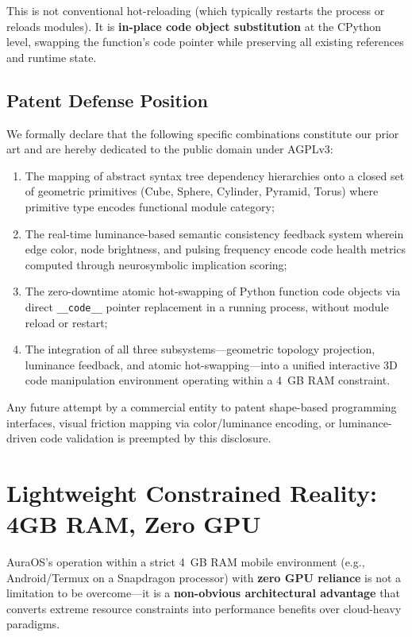 \documentclass[11pt]{article}
\begin{document}
This is not conventional hot-reloading (which typically restarts the process or reloads modules). It is \textbf{in-place code object substitution} at the CPython level, swapping the function's code pointer while preserving all existing references and runtime state.

\subsection{Patent Defense Position}

We formally declare that the following specific combinations constitute our prior art and are hereby dedicated to the public domain under AGPLv3:

\begin{enumerate}[label=\textbf{VD\arabic*}, leftmargin=*]
    \item The mapping of abstract syntax tree dependency hierarchies onto a closed set of geometric primitives (Cube, Sphere, Cylinder, Pyramid, Torus) where primitive type encodes functional module category;
    \item The real-time luminance-based semantic consistency feedback system wherein edge color, node brightness, and pulsing frequency encode code health metrics computed through neurosymbolic implication scoring;
    \item The zero-downtime atomic hot-swapping of Python function code objects via direct \texttt{\_\_code\_\_} pointer replacement in a running process, without module reload or restart;
    \item The integration of all three subsystems—geometric topology projection, luminance feedback, and atomic hot-swapping—into a unified interactive 3D code manipulation environment operating within a 4~GB RAM constraint.
\end{enumerate}

Any future attempt by a commercial entity to patent shape-based programming interfaces, visual friction mapping via color/luminance encoding, or luminance-driven code validation is preempted by this disclosure.

\section{Lightweight Constrained Reality: 4GB RAM, Zero GPU}

AuraOS's operation within a strict 4~GB RAM mobile environment (e.g., Android/Termux on a Snapdragon processor) with \textbf{zero GPU reliance} is not a limitation to be overcome—it is a \textbf{non-obvious architectural advantage} that converts extreme resource constraints into performance benefits over cloud-heavy paradigms.
\end{document}
